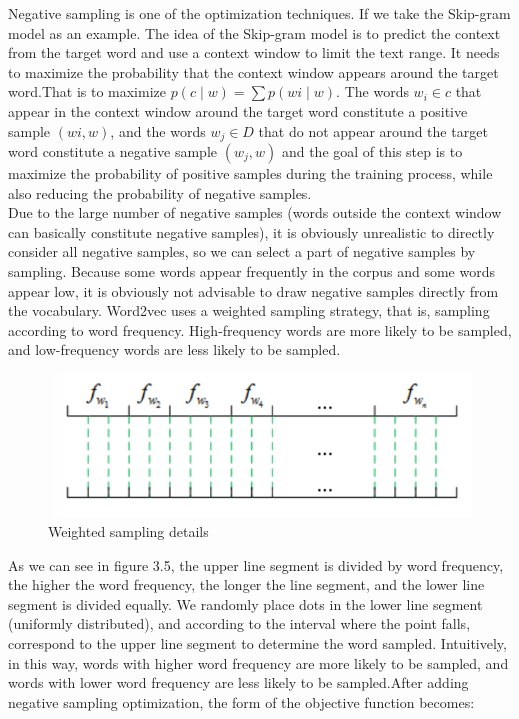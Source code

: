 \noindent Negative sampling is one of the optimization techniques. If we take the Skip-gram model as an example. The idea of the Skip-gram model is to predict the context from the target word and use a context window to limit the text range. It needs to maximize the probability that the context window appears around the target word.That is to maximize $p(c∣w)=∑p(wi∣w)$. The words $w_i ∈ c$ that appear in the context window around the target word constitute a positive sample $(wi, w)$, and the words $w_j ∈ D$ that do not appear around the target word constitute a negative sample $(w_j, w)$ and the goal of this step is to maximize the probability of positive samples during the training process, while also reducing the probability of negative samples.\\

\noindent Due to the large number of negative samples (words outside the context window can basically constitute negative samples), it is obviously unrealistic to directly consider all negative samples, so we can select a part of negative samples by sampling. Because some words appear frequently in the corpus and some words appear low, it is obviously not advisable to draw negative samples directly from the vocabulary. Word2vec uses a weighted sampling strategy, that is, sampling according to word frequency. High-frequency words are more likely to be sampled, and low-frequency words are less likely to be sampled.\\

\begin{figure}[ht]

\centering
\includegraphics[scale=1.3]{images/image_largevis_word2vec_seperate_lines.PNG}
\caption{Weighted sampling details}
\label{fig:label}
\end{figure}

\noindent As we can see in figure 3.5, the upper line segment is divided by word frequency, the higher the word frequency, the longer the line segment, and the lower line segment is divided equally. We randomly place dots in the lower line segment (uniformly distributed), and according to the interval where the point falls, correspond to the upper line segment to determine the word sampled. Intuitively, in this way, words with higher word frequency are more likely to be sampled, and words with lower word frequency are less likely to be sampled.After adding negative sampling optimization, the form of the objective function becomes:

